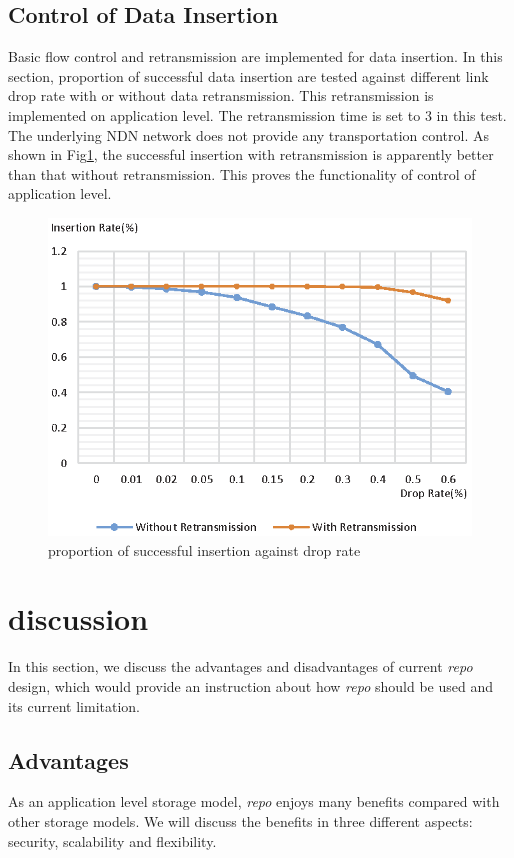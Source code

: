 \documentclass[conference]{IEEEtran}
\begin{document}
\subsection{Control of Data Insertion}

Basic flow control and retransmission are implemented for data insertion. In this section, proportion of successful data insertion are tested against different link drop rate with or without data retransmission. This retransmission is implemented on application level. The retransmission time is set to 3 in this test. The underlying NDN network does not provide any transportation control. As shown in Fig\ref{drop-rate}, the successful insertion with retransmission is apparently better than that without retransmission. This proves the functionality of control of application level.

\begin{figure}[htbp]
\centering
\includegraphics{drop-rate.eps}
\caption{proportion of successful insertion against drop rate}
\label{drop-rate}
\end{figure}

\section{discussion} \label{section-discussion}

In this section, we discuss the advantages and disadvantages of current \emph{repo} design, which would provide an instruction about how \emph{repo} should be used and its current limitation.

\subsection{Advantages}
As an application level storage model, \emph{repo} enjoys many benefits compared with other storage models. We will discuss the benefits in three different aspects: security, scalability and flexibility.
\end{document}
